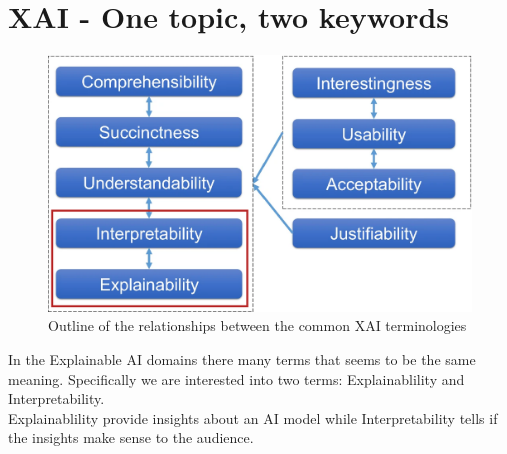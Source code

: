 \section{XAI - One topic, two keywords}
\begin{minipage}[c]{0.3\textwidth}
    \begin{figure}[H]
        \includegraphics[width=\textwidth]{img/many_words.png}
        \centering
        \caption{Outline of the relationships between the common XAI terminologies}
    \end{figure}    
\end{minipage}
\hfill%
\begin{minipage}[c]{0.65\textwidth}
    In the Explainable AI domains there many terms that seems to be the same meaning.
    Specifically we are interested into two terms: Explainablility and Interpretability.\\
    
    Explainablility provide insights about an AI model while Interpretability tells if the insights make sense to the audience.
\end{minipage}

